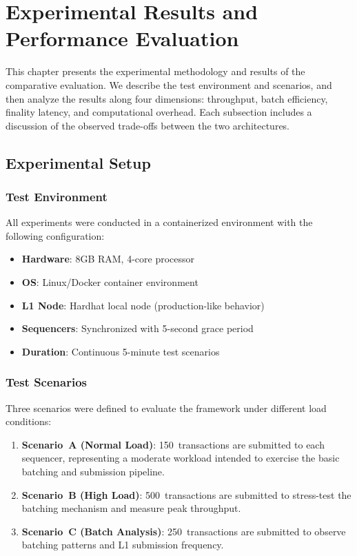 \chapter{Experimental Results and Performance Evaluation}
\label{ch:evaluation}

This chapter presents the experimental methodology and results of the comparative evaluation. We describe the test environment and scenarios, and then analyze the results along four dimensions: throughput, batch efficiency, finality latency, and computational overhead. Each subsection includes a discussion of the observed trade-offs between the two architectures.

\section{Experimental Setup}

\subsection{Test Environment}

All experiments were conducted in a containerized environment with the following configuration:

\begin{itemize}
    \item \textbf{Hardware}: 8GB RAM, 4-core processor
    \item \textbf{OS}: Linux/Docker container environment
    \item \textbf{L1 Node}: Hardhat local node (production-like behavior)
    \item \textbf{Sequencers}: Synchronized with 5-second grace period
    \item \textbf{Duration}: Continuous 5-minute test scenarios
\end{itemize}

\subsection{Test Scenarios}

Three scenarios were defined to evaluate the framework under different load conditions:

\begin{enumerate}
    \item \textbf{Scenario~A (Normal Load)}: 150~transactions are submitted to each sequencer, representing a moderate workload intended to exercise the basic batching and submission pipeline.
    \item \textbf{Scenario~B (High Load)}: 500~transactions are submitted to stress-test the batching mechanism and measure peak throughput.
    \item \textbf{Scenario~C (Batch Analysis)}: 250~transactions are submitted to observe batching patterns and L1 submission frequency.
\end{enumerate}


